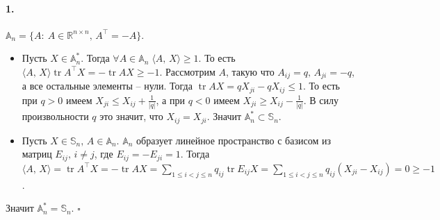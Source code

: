 \documentclass{article}
\DeclareMathOperator{\tr}{tr}
\newcommand*{\QED}{\null\nobreak\hfill\ensuremath{\square}}%
\newcommand*{\R}{\mathbb{R}}
\begin{document}
\paragraph{1.} $ \mathbb{A}_n = \{ A:\: A \in \R^{n \times n},\, A^\top = -A \} $.
\begin{itemize}
    \item Пусть $ X \in \mathbb{A}_n^\ast $. Тогда $ \forall A \in \mathbb{A}_n \; \langle A,\, X \rangle \geqslant 1 $. То есть $ \langle A,\, X \rangle \tr A^\top X = -\tr AX \geqslant -1 $. Рассмотрим $A$, такую что $A_{ij} = q,\, A_{ji} = -q$, а все остальные элементы -- нули. Тогда $ \tr AX = q X_{ji} - q X_{ij} \leqslant 1 $. То есть при $q > 0$ имеем $ X_{ji} \leqslant X_{ij} + \frac{1}{|q|} $, а при $q < 0$ имеем $X_{ji} \geqslant X_{ij} - \frac{1}{|q|}$. В силу произвольности $q$ это значит, что $X_{ij} = X_{ji}$. Значит $ \mathbb{A}_n^\ast \subset \mathbb{S}_n $.
    \item Пусть $ X \in \mathbb{S}_n,\, A \in \mathbb{A}_n $. $\mathbb{A}_n $ образует линейное пространство с базисом из матриц $E_{ij},\, i \neq j$, где $E_{ij} = -E_{ji} = 1$. Тогда $ \langle A,\, X \rangle = \tr A^{\top}X = -\tr AX = \sum\limits_{1 \leqslant i < j \leqslant n} q_{ij} \tr E_{ij} X = \sum\limits_{1 \leqslant i < j \leqslant n} q_{ij} (X_{ji} - X_{ij}) = 0 \geqslant -1 $. 
\end{itemize}
Значит $\mathbb{A}_n^\ast = \mathbb{S}_n$. \QED
\end{document}
